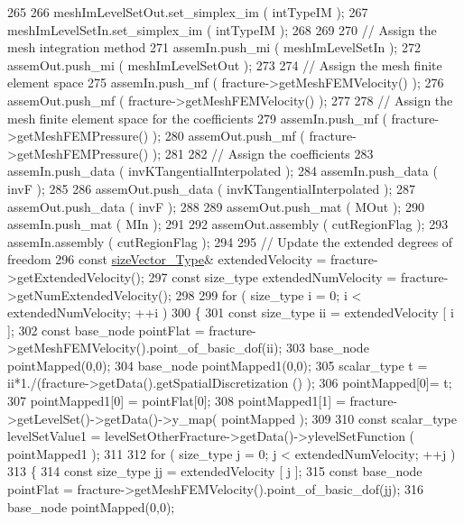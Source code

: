 \begin{DoxyCode}
265 
266     meshImLevelSetOut.set\_simplex\_im ( intTypeIM );
267     meshImLevelSetIn.set\_simplex\_im ( intTypeIM );
268 
269 
270     \textcolor{comment}{// Assign the mesh integration method}
271     assemIn.push\_mi ( meshImLevelSetIn );
272     assemOut.push\_mi ( meshImLevelSetOut );
273 
274     \textcolor{comment}{// Assign the mesh finite element space}
275     assemIn.push\_mf ( fracture->getMeshFEMVelocity() );
276     assemOut.push\_mf ( fracture->getMeshFEMVelocity() );
277 
278     \textcolor{comment}{// Assign the mesh finite element space for the coefficients}
279     assemIn.push\_mf ( fracture->getMeshFEMPressure() );
280     assemOut.push\_mf ( fracture->getMeshFEMPressure() );
281 
282     \textcolor{comment}{// Assign the coefficients}
283     assemIn.push\_data ( invKTangentialInterpolated );
284     assemIn.push\_data ( invF );
285 
286     assemOut.push\_data ( invKTangentialInterpolated );
287     assemOut.push\_data ( invF );
288 
289     assemOut.push\_mat ( MOut );
290     assemIn.push\_mat ( MIn );
291 
292     assemOut.assembly ( cutRegionFlag );
293     assemIn.assembly ( cutRegionFlag );
294 
295     \textcolor{comment}{// Update the extended degrees of freedom}
296     \textcolor{keyword}{const} \hyperlink{Core_8h_a83c51913d041a5001e8683434c09857f}{sizeVector\_Type}& extendedVelocity = fracture->getExtendedVelocity();
297     \textcolor{keyword}{const} size\_type extendedNumVelocity = fracture->getNumExtendedVelocity();
298 
299     \textcolor{keywordflow}{for} ( size\_type i = 0; i < extendedNumVelocity; ++i )
300     \{
301     \textcolor{keyword}{const} size\_type ii = extendedVelocity [ i ];
302     \textcolor{keyword}{const} base\_node pointFlat = fracture->getMeshFEMVelocity().point\_of\_basic\_dof(ii);
303         base\_node pointMapped(0,0);
304         base\_node pointMapped1(0,0);
305     scalar\_type t = ii*1./(fracture->getData().getSpatialDiscretization () );
306         pointMapped[0]= t;
307     pointMapped1[0] = pointFlat[0];
308         pointMapped1[1] = fracture->getLevelSet()->getData()->y\_map( pointMapped );
309     
310         \textcolor{keyword}{const} scalar\_type levelSetValue1 = levelSetOtherFracture->getData()->ylevelSetFunction ( 
      pointMapped1 );
311 
312         \textcolor{keywordflow}{for} ( size\_type j = 0; j < extendedNumVelocity; ++j )
313         \{
314             \textcolor{keyword}{const} size\_type jj = extendedVelocity [ j ];
315             \textcolor{keyword}{const} base\_node pointFlat = fracture->getMeshFEMVelocity().point\_of\_basic\_dof(jj);
316             base\_node pointMapped(0,0);

\end{DoxyCode}
